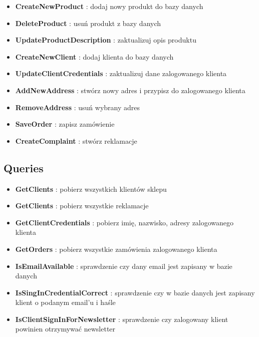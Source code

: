 \documentclass[12pt]{report}
\begin{document}
			\begin{itemize}
				\item \textbf{CreateNewProduct} : dodaj nowy produkt do bazy danych
				
				\item \textbf{DeleteProduct} : usuń produkt z bazy danych
				
				\item \textbf{UpdateProductDescription} : zaktualizuj opis produktu
						
				\item \textbf{CreateNewClient} : dodaj klienta do bazy danych 
				
				\item \textbf{UpdateClientCredentials} : zaktualizuj dane zalogowanego klienta
				
				\item \textbf{AddNewAddress} : stwórz nowy adres i przypisz do zalogowanego klienta
				
				\item \textbf{RemoveAddress} : usuń wybrany adres
				
				\item \textbf{SaveOrder} : zapisz zamówienie
				
				\item \textbf{CreateComplaint} : stwórz reklamacje
				
			\end{itemize}	
		\subsection{Queries}
			\begin{itemize}
				\item \textbf{GetClients} : pobierz wszystkich klientów sklepu
				
				\item \textbf{GetClients} : pobierz wszystkie reklamacje 
			
				\item \textbf{GetClientCredentials} : pobierz imię, nazwisko, adresy zalogowanego klienta
				
				\item \textbf{GetOrders} : pobierz wszystkie zamówienia zalogowanego klienta 
		
				\item \textbf{IsEmailAvailable} : sprawdzenie czy dany email jest zapisany w bazie danych
	
				\item \textbf{IsSingInCredentialCorrect} : sprawdzenie czy w bazie danych jest zapisany klient o podanym email’u i haśle
		
				\item \textbf{IsClientSignInForNewsletter} : sprawdzenie czy zalogowany klient powinien otrzymywać newsletter
			\end{itemize}
\end{document}
